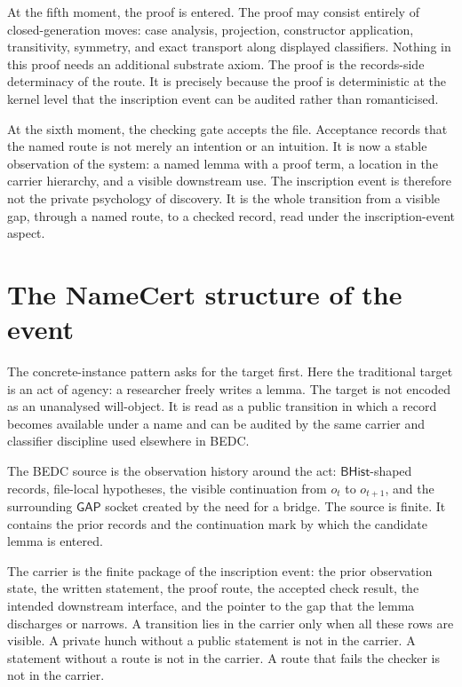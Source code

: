 At the fifth moment, the proof is entered.  The proof may consist entirely
of closed-generation moves: case analysis, projection, constructor
application, transitivity, symmetry, and exact transport along displayed
classifiers.  Nothing in this proof needs an additional substrate axiom.  The
proof is the records-side determinacy of the route.  It is precisely because
the proof is deterministic at the kernel level that the inscription event can
be audited rather than romanticised.

At the sixth moment, the checking gate accepts the file.  Acceptance records
that the named route is not merely an intention or an intuition.  It is now a
stable observation of the system: a named lemma with a proof term, a location
in the carrier hierarchy, and a visible downstream use.  The inscription
event is therefore not the private psychology of discovery.  It is the whole
transition from a visible gap, through a named route, to a checked record,
read under the inscription-event aspect.

\section{The NameCert structure of the event}
\label{sec:inscription-event-namecert-structure}

The concrete-instance pattern asks for the target first.  Here the
traditional target is an act of agency: a researcher freely writes a lemma.
The target is not encoded as an unanalysed will-object.  It is read as a
public transition in which a record becomes available under a name and can be
audited by the same carrier and classifier discipline used elsewhere in
BEDC.

The BEDC source is the observation history around the act:
$\mathsf{BHist}$-shaped records, file-local hypotheses, the visible
continuation from $o_t$ to $o_{t+1}$, and the surrounding $\mathsf{GAP}$
socket created by the need for a bridge.  The source is finite.  It contains
the prior records and the continuation mark by which the candidate lemma is
entered.

The carrier is the finite package of the inscription event:
the prior observation state, the written statement, the proof route, the
accepted check result, the intended downstream interface, and the pointer to
the gap that the lemma discharges or narrows.  A transition lies in the
carrier only when all these rows are visible.  A private hunch without a
public statement is not in the carrier.  A statement without a route is not
in the carrier.  A route that fails the checker is not in the carrier.

